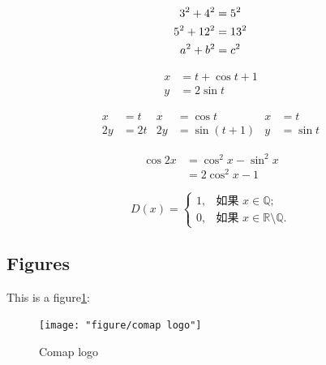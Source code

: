 \documentclass[12pt]{article}  %
\begin{document}
\begin{gather}
    3^2 + 4^2 = 5^2 \notag \\
    5^2 + 12^2 = 13^2 \notag \\
    a^2 + b^2 = c^2
\end{gather}

\begin{align}
    x & = t + \cos t + 1 \\
    y & = 2\sin t
\end{align}

\begin{align*} %
    x  & = t & x  & = \cos t    & x & = t      \\
    2y & =2t & 2y & = \sin(t+1) & y & = \sin t
\end{align*}

\begin{equation}
    \begin{split}
        \cos 2x &= \cos^2 x - \sin^2 x \\
        &= 2\cos^2 x - 1
    \end{split}
\end{equation}

\begin{equation}
    D(x) = \begin{cases}
        1, & \text{如果 } x \in \mathbb{Q};                      \\
        0, & \text{如果 } x \in \mathbb{R} \setminus \mathbb{Q}.
    \end{cases}
\end{equation}

\subsection{Figures}
This is a figure\ref{fig:comap-logo}:
\begin{figure}[h]
    \centering
    \texttt{[image: "figure/comap logo"]}
    \caption{Comap logo}
    \label{fig:comap-logo}
\end{figure}
\end{document}
